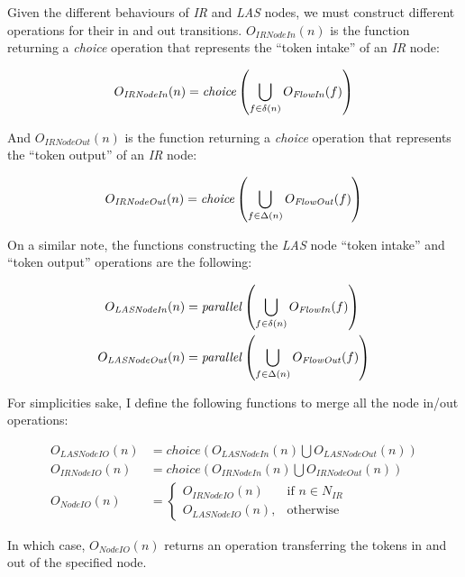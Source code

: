 \begin{definition}
	Given the different behaviours of \emph{IR} and \emph{LAS} nodes, we must construct different operations for their in and out transitions. \(O_\mathit{IRNodeIn}(n)\) is the function returning a \emph{choice} operation that represents the \enquote{token intake} of an \emph{IR} node:
	
	\begin{equation*}
		O_\mathit{IRNodeIn}(n) = \mathit{choice}\left(\bigcup_{f \in \delta(n)} O_\mathit{FlowIn}(f)\right)
	\end{equation*}
	
	And \(O_\mathit{IRNodeOut}(n)\) is the function returning a \emph{choice} operation that represents the \enquote{token output} of an \emph{IR} node:

	\begin{equation*}
		O_\mathit{IRNodeOut}(n) = \mathit{choice}\left(\bigcup_{f \in \Delta(n)} O_\mathit{FlowOut}(f)\right)
	\end{equation*}

	On a similar note, the functions constructing the \emph{LAS} node \enquote{token intake} and \enquote{token output} operations are the following:
	
	\begin{align*}
		O_\mathit{LASNodeIn}(n) &= \mathit{parallel}\left(\bigcup_{f \in \delta(n)} O_\mathit{FlowIn}(f)\right)\\
		O_\mathit{LASNodeOut}(n) &= \mathit{parallel}\left(\bigcup_{f \in \Delta(n)} O_\mathit{FlowOut}(f)\right)
	\end{align*}

	For simplicities sake, I define the following functions to merge all the node in/out operations:

	\begin{align*}
		O_\mathit{LASNodeIO}(n) &= \mathit{choice}(O_\mathit{LASNodeIn}(n) \bigcup O_\mathit{LASNodeOut}(n))\\
		O_\mathit{IRNodeIO}(n) &= \mathit{choice}(O_\mathit{IRNodeIn}(n) \bigcup O_\mathit{IRNodeOut}(n))\\
		O_\mathit{NodeIO}(n) &= 
		\begin{cases}
			O_\mathit{IRNodeIO}(n) & \text{if } n \in N_{IR} \\
			O_\mathit{LASNodeIO}(n), & \text{otherwise}
		\end{cases}
	\end{align*}

	In which case, \(O_\mathit{NodeIO}(n)\) returns an operation transferring the tokens in and out of the specified node. 

\end{definition}

